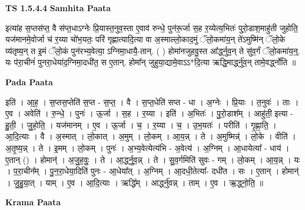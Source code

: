 \documentclass[17pt]{extarticle}
\begin{document}
\textbf{TS 1.5.4.4 } \newline
\textbf{Samhita Paata} \newline

इत्या॑ह स॒प्तस॑प्त॒ वै स॑प्त॒धाऽग्नेः प्रि॒यास्त॒नुव॒स्ता ए॒वाव॑ रुन्धे॒ पुन॑रू॒र्जा स॒ह र॒य्येत्य॒भितः॑ पुरो॒डाश॒माहु॑ती जुहोति॒ यज॑मानमे॒वोर्जा च॑ र॒य्या चो॑भ॒यतः॒ परि॑ गृह्णात्यादि॒त्या वा अ॒स्माल्लो॒काद॒मुं ॅलो॒कमा॑य॒॒न् ते॑ऽमुष्मि॑न् ॅलो॒के व्य॑तृष्य॒न् त इ॒मं ॅलो॒कं पुन॑रभ्य॒वेत्या॒ ऽग्निमा॒धायै॒-तान्. ( ) होमा॑नजुहवु॒स्त आ᳚र्द्ध्नुव॒॒न् ते सु॑व॒र्गं ॅलो॒कमा॑य॒न्॒. यः प॑रा॒चीनं॑ पुनरा॒धेया॑द॒ग्निमा॒दधी॑त॒ स ए॒तान्. होमा᳚न् जुहुया॒द्यामे॒वाऽऽ*दि॒त्या ऋद्धि॒मार्द्ध्नु॑व॒न् तामे॒वर्द्ध्नो॑ति ॥ \newline

\textbf{Pada Paata} \newline

इति॑ । आ॒ह॒ । स॒प्तस॒प्तेति॑ स॒प्त - स॒प्त॒ । वै । स॒प्त॒धेति॑ सप्त - धा । अ॒ग्नेः । प्रि॒याः । त॒नुवः॑ । ताः । ए॒व । अवेति॑ । रु॒न्धे॒ । पुनः॑ । ऊ॒र्जा । स॒ह । र॒य्या । इति॑ । अ॒भितः॑ । पु॒रो॒डाश᳚म् । आहु॑ती॒ इत्या - हु॒ती॒ । जु॒हो॒ति॒ । यज॑मानम् । ए॒व । ऊ॒र्जा । च॒ । र॒य्या । च॒ । उ॒भ॒यतः॑ । परीति॑ । गृ॒ह्णा॒ति॒ । आ॒दि॒त्याः । वै । अ॒स्मात् । लो॒कात् । अ॒मुम् । लो॒कम् । आ॒य॒न्न् । ते । अ॒मुष्मिन्न्॑ । लो॒के । वीति॑ । अ॒तृ॒ष्य॒न्न् । ते । इ॒मम् । लो॒कम् । पुनः॑ । अ॒भ्य॒वेत्येत्य॑भि - अ॒वेत्य॑ । अ॒ग्निम् । आ॒धायेत्या᳚ - धाय॑ । ए॒तान् () । होमान्॑ । अ॒जु॒ह॒वुः॒ । ते । आ॒र्द्ध्नु॒व॒न्न् । ते । सु॒व॒र्गमिति॑ सुवः - गम् । लो॒कम् । आ॒य॒न्न् । यः । प॒रा॒चीन᳚म् । पु॒न॒रा॒धेया॒दिति॑ पुनः - आ॒धेया᳚त् । अ॒ग्निम् । आ॒दधी॒तेत्या᳚- दधी॑त । सः । ए॒तान् । होमान्॑ । जु॒हु॒या॒त् । याम् । ए॒व । आ॒दि॒त्याः । ऋद्धि᳚म् । आर्द्ध्नु॑वन्न् । ताम् । ए॒व । ऋ॒द्ध्नो॒ति॒ ॥  \newline


\textbf{Krama Paata} \newline
\end{document}

